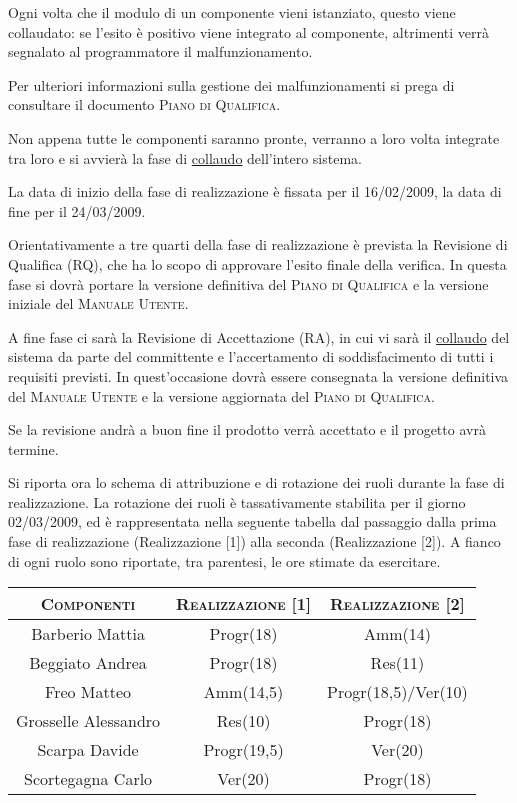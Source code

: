 \documentclass[11pt,a4paper]{article}
\begin{document}
Ogni volta che il modulo di un componente vieni istanziato, questo viene collaudato: se l'esito è positivo viene integrato al componente, altrimenti verrà segnalato al programmatore il malfunzionamento.

Per ulteriori informazioni sulla gestione dei malfunzionamenti si prega di consultare il documento \textsc{Piano di Qualifica}.

Non appena tutte le componenti saranno pronte, verranno a loro volta integrate tra loro e si avvierà la fase di \underline{collaudo} dell'intero sistema.

La data di inizio della fase di realizzazione è fissata per il 16/02/2009, la data di fine per il 24/03/2009.

Orientativamente a tre quarti della fase di realizzazione è prevista la Revisione di Qualifica (RQ), che ha lo scopo di approvare l'esito finale della verifica. In questa fase si dovrà portare la versione definitiva del \textsc{Piano di Qualifica} e la versione iniziale del \textsc{Manuale Utente}.

A fine fase ci sarà la Revisione di Accettazione (RA), in cui vi sarà il \underline{collaudo} del sistema da parte del committente e l'accertamento di soddisfacimento di tutti i requisiti previsti. In quest'occasione dovrà essere consegnata la versione definitiva del \textsc{Manuale Utente} e la versione aggiornata del \textsc{Piano di Qualifica}.

Se la revisione andrà a buon fine il prodotto verrà accettato e il progetto avrà termine.

Si riporta ora lo schema di attribuzione e di rotazione dei ruoli durante la fase di realizzazione.
La rotazione dei ruoli è tassativamente stabilita per il giorno 02/03/2009, ed è rappresentata nella seguente tabella dal passaggio dalla prima fase di realizzazione (Realizzazione [1]) alla seconda (Realizzazione [2]).
A fianco di ogni ruolo sono riportate, tra parentesi, le ore stimate da esercitare.
\\
\begin{center}
\begin{tabular}{|c||c|c|}
\hline
\textsc{Componenti} & \textsc{Realizzazione [1]} & \textsc{Realizzazione [2]} \\ \hline \hline
Barberio Mattia & Progr(18) & Amm(14) \\ \hline
Beggiato Andrea & Progr(18) & Res(11) \\ \hline
Freo Matteo & Amm(14,5) & Progr(18,5)/Ver(10) \\ \hline
Grosselle Alessandro & Res(10) & Progr(18) \\ \hline
Scarpa Davide & Progr(19,5) & Ver(20) \\ \hline
Scortegagna Carlo & Ver(20) & Progr(18) \\ \hline
\end{tabular}
\end{center}
\bigskip
\end{document}

